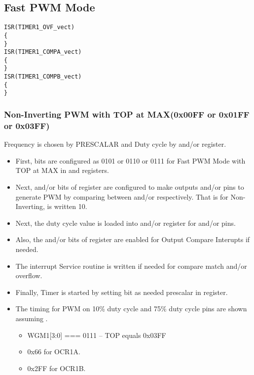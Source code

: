 \subsection{Fast PWM Mode}
\begin{verbatim}
ISR(TIMER1_OVF_vect)
{
} 
ISR(TIMER1_COMPA_vect)
{
}
ISR(TIMER1_COMPB_vect)
{
}
\end{verbatim}
\subsubsection{Non-Inverting PWM with TOP at MAX(0x00FF or 0x01FF or 0x03FF)}
\quad Frequency is chosen by PRESCALAR and Duty cycle by  and/or  register.
\begin{itemize}
    \item First,  bits are configured as 0101 or 0110 or 0111 for Fast PWM Mode with TOP at MAX in  and  registers.
    \item Next,  and/or  bits of  register are configured to make outputs  and/or  pins to generate PWM by comparing between  and/or  respectively. That is for Non-Inverting,  is written 10.
    \item Next, the duty cycle value is loaded into  and/or  register for  and/or  pins.
    \item Also, the  and/or  bits of  register  are enabled for Output Compare Interupts if needed.
    \item The interrupt Service routine is written if needed for compare match and/or overflow.
    \item Finally, Timer is started by setting  bit as needed prescalar in  register.
    \item The timing for PWM on 10\% duty cycle  and 75\% duty cycle pins are shown assuming .
    \begin{itemize}
        \item WGM1[3:0] === 0111 --	TOP equals 0x03FF
        \item 0x66 for OCR1A.
        \item 0x2FF for OCR1B.
    \end{itemize}
\end{itemize}


